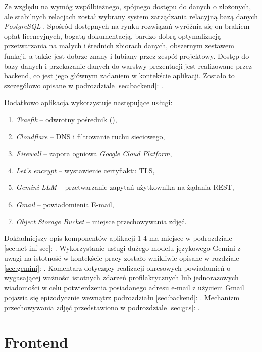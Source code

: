 Ze względu na wymóg współbieżnego, spójnego dostępu do danych o złożonych, ale stabilnych relacjach został wybrany system zarządzania relacyjną bazą danych \textit{PostgreSQL} \cite{postgres}. Spośród dostępnych na rynku rozwiązań wyróżnia się on brakiem opłat licencyjnych, bogatą dokumentacją, bardzo dobrą optymalizacją przetwarzania na małych i średnich zbiorach danych, obszernym zestawem funkcji, a także jest dobrze znany i lubiany przez zespół projektowy. Dostęp do bazy danych i przekazanie danych do warstwy prezentacji jest realizowane przez backend, co jest jego głównym zadaniem w kontekście aplikacji. Zostało to szczegółowo opisane w podrozdziale \ref{sec:backend}: . 

Dodatkowo aplikacja wykorzystuje następujące usługi:
\begin{enumerate}
    \item \textit{Traefik} -- odwrotny pośrednik (),
    \item \textit{Cloudflare} -- DNS i filtrowanie ruchu sieciowego,
    \item \textit{Firewall} -- zapora ogniowa \textit{Google Cloud Platform},
    \item \textit{Let's encrypt} -- wystawienie certyfiaktu TLS,
    \item \textit{Gemini LLM} -- przetwarzanie zapytań użytkownika na żądania REST,
    \item \textit{Gmail} -- powiadomienia E-mail,
    \item \textit{Object Storage Bucket} -- miejsce przechowywania zdjęć.
\end{enumerate}
Dokładniejszy opis komponentów aplikacji 1-4 ma miejsce w podrozdziale \ref{sec:net-inf-sec}: . Wykorzystanie usługi dużego modelu językowego Gemini z uwagi na istotność w kontekście pracy zostało wnikliwie opisane w rozdziale \ref{sec:gemini}: . Komentarz dotyczący realizacji okresowych powiadomień o wygasającej ważności istotnych zdarzeń profilaktycznych lub jednorazowych wiadomości w celu potwierdzenia posiadanego adresu e-mail z użyciem Gmail pojawia się epizodycznie wewnątrz podrozdziału \ref{sec:backend}: . Mechanizm przechowywania zdjęć przedstawiono w podrozdziale \ref{sec:gcs}: .

\section{Frontend}

